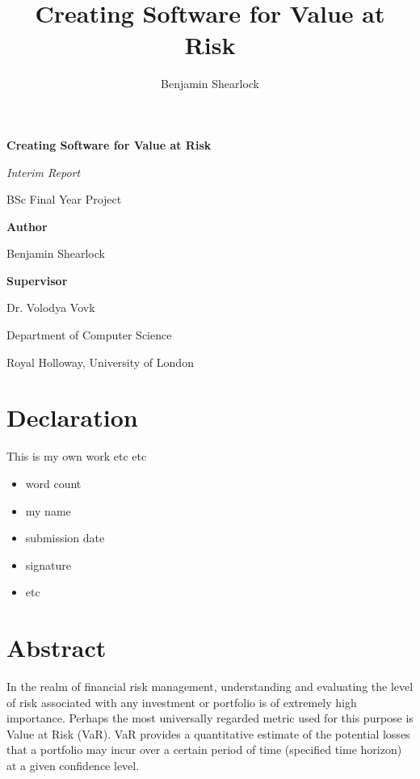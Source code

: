 \documentclass{article}
\title{Creating Software for Value at Risk}
\author{Benjamin Shearlock}
\begin{document}
\begin{titlepage}
  \begin{center}
    \vspace*{1cm}
    {\LARGE \textbf{Creating Software for Value at Risk} \par} 
    \vspace{1.5cm}
    {\Large \textit{Interim Report} \par}
    \vspace{0.5cm}
    {\Large BSc Final Year Project \par}
    \vspace{2cm}
    {\large \textbf{Author} \par}
    {\large Benjamin Shearlock \par}
    \vspace{2cm}
    {\large \textbf{Supervisor} \par}
    {\large Dr. Volodya Vovk \par}
    \vfill
    {\large Department of Computer Science \par}
    {\large Royal Holloway, University of London \par}
  \end{center}
\end{titlepage}

\setlength{\parindent}{0pt}

\section*{Declaration}
This is my own work etc etc

\begin{itemize}
  \item word count
  \item my name
  \item submission date
  \item signature
  \item etc
\end{itemize}

\newpage

\tableofcontents

\newpage

\section{Abstract}
In the realm of financial risk management, understanding and evaluating the level of risk associated with any investment or portfolio is of extremely high importance. Perhaps the most universally regarded metric used for this purpose is Value at Risk (VaR). VaR provides a quantitative estimate of the potential losses that a portfolio may incur over a certain period of time (specified time horizon) at a given confidence level. \\
\end{document}
